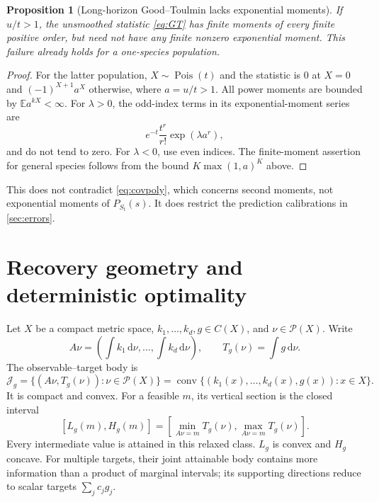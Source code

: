 \documentclass[11pt]{article}
\numberwithin{equation}{section}
\newtheorem{proposition}[proposition]{Proposition}
\theoremstyle{definition}
\theoremstyle{remark}
\newcommand{\E}{\mathbb E}
\newcommand{\Prob}{\mathcal P}
\newcommand{\Pois}{\operatorname{Pois}}
\newcommand{\conv}{\operatorname{conv}}
\newcommand{\dd}{\,\mathrm d}
\begin{document}
\begin{proposition}[Long-horizon Good--Toulmin lacks exponential moments]\label{prop:gtmgf}
If $u/t>1$, the unsmoothed statistic \eqref{eq:GT} has finite moments of every finite positive order, but need not have any finite nonzero exponential moment. This failure already holds for a one-species population.
\end{proposition}
\begin{proof}
For the latter population, $X\sim\Pois(t)$ and the statistic is $0$ at $X=0$ and $(-1)^{X+1}a^X$ otherwise, where $a=u/t>1$. All power moments are bounded by $\E a^{kX}<\infty$. For $\lambda>0$, the odd-index terms in its exponential-moment series are
\[
 e^{-t}\frac{t^r}{r!}\exp(\lambda a^r),
\]
and do not tend to zero. For $\lambda<0$, use even indices. The finite-moment assertion for general species follows from the bound $K\max(1,a)^K$ above.
\end{proof}
This does not contradict \eqref{eq:covpoly}, which concerns second moments, not exponential moments of $P_{S_t}(s)$. It does restrict the prediction calibrations in \cref{sec:errors}.

\section{Recovery geometry and deterministic optimality}\label{sec:geometry}
Let $X$ be a compact metric space, $k_1,\ldots,k_d,g\in C(X)$, and $\nu\in\Prob(X)$. Write
\[
 A\nu=\left(\int k_1\dd\nu,\ldots,\int k_d\dd\nu\right),\qquad
 T_g(\nu)=\int g\dd\nu.
\]
The observable--target body is
\begin{equation}\label{eq:jointbody}
 \mathcal J_g=\{(A\nu,T_g(\nu)):\nu\in\Prob(X)\}
 =\conv\{(k_1(x),\ldots,k_d(x),g(x)):x\in X\}.
\end{equation}
It is compact and convex. For a feasible $m$, its vertical section is the closed interval
\[
 [L_g(m),H_g(m)]
 =\left[\min_{A\nu=m}T_g(\nu),\max_{A\nu=m}T_g(\nu)\right].
\]
Every intermediate value is attained in this relaxed class. $L_g$ is convex and $H_g$ concave. For multiple targets, their joint attainable body contains more information than a product of marginal intervals; its supporting directions reduce to scalar targets $\sum_jc_jg_j$.
\end{document}
